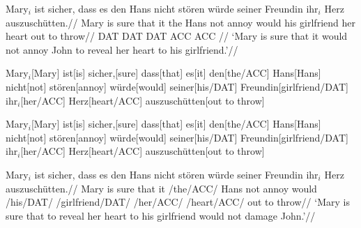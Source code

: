 

\ex
\hsize=5in
\begingl[everyglc=\tenrm,aboveglcskip=-2pt,glspace=!.5em,
   extraglskip=1ex,aboveglftskip=0pt]
\gla Mary$_i$ ist sicher, dass es den Hans nicht st\"oren w\"urde
seiner Freundin ihr$_i$ Herz auszusch\"utten.//
\glb Mary is sure that it the Hans not annoy would
his girlfriend her heart {out to throw}//
\glc {} {} {} {} {} DAT {} {} {} {} DAT DAT ACC ACC //
\glft  `Mary is sure that it would not annoy John to reveal her
heart to his girlfriend.'//
\endgl
\xe



\ex[glstyle=nlevel,glhangstyle=normal,glneveryline={\it,,\footnotesize},
   glnabovelineextraskip={,,-3pt}]
\begingl
Mary$_i$[Mary]
ist[is]
sicher,[sure]
dass[that]
es[it]
den[the/ACC]
Hans[Hans]
nicht[not]
st\"oren[annoy]
w\"urde[would]
seiner[his/DAT]
Freundin[girlfriend/DAT]
ihr$_i$[her/ACC]
Herz[heart/ACC]
auszusch\"utten[out to throw]
\endgl
\xe

\ex[glstyle=nlevel,glhangstyle=normal,glneveryline={\it,,\footnotesize},
   glnabovelineextraskip={,,-3pt},glwordalign=center]
\begingl
Mary$_i$[Mary]
ist[is]
sicher,[sure]
dass[that]
es[it]
den[the/ACC]
Hans[Hans]
nicht[not]
st\"oren[annoy]
w\"urde[would]
seiner[his/DAT]
Freundin[girlfriend/DAT]
ihr$_i$[her/ACC]
Herz[heart/ACC]
auszusch\"utten[out to throw]
\endgl
\xe

\ex[glhangstyle=normal,glufcloseup=.4ex,everygluf=\footnotesize]
\begingl
\gla Mary$_i$ ist sicher, dass es den Hans nicht st\"oren
   w\"urde seiner Freundin ihr$_i$ Herz auszusch\"utten.//
\glb Mary is sure that it \gluf/the/ACC/ Hans not annoy would
   \gluf/his/DAT/ \gluf/girlfriend/DAT/ \gluf/her/ACC/
   \gluf/heart/ACC/ {out to throw}//
\glft `Mary is sure that to reveal her heart to his girlfriend
would not damage John.'//
\endgl
\xe

\endinput











`Mary is sure that to reveal her heart to his girlfriend
would not damage John.'//
\endgl
\xe

\endinput

%
%
%
%
%
%


